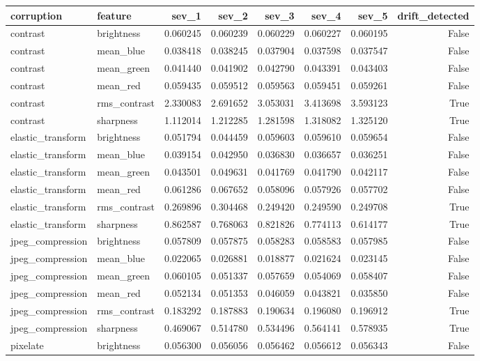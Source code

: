 \begin{tabular}{llrrrrrr}
\toprule
corruption & feature & sev_1 & sev_2 & sev_3 & sev_4 & sev_5 & drift_detected \\
\midrule
contrast & brightness & 0.060245 & 0.060239 & 0.060229 & 0.060227 & 0.060195 & False \\
contrast & mean_blue & 0.038418 & 0.038245 & 0.037904 & 0.037598 & 0.037547 & False \\
contrast & mean_green & 0.041440 & 0.041902 & 0.042790 & 0.043391 & 0.043403 & False \\
contrast & mean_red & 0.059435 & 0.059512 & 0.059563 & 0.059451 & 0.059261 & False \\
contrast & rms_contrast & 2.330083 & 2.691652 & 3.053031 & 3.413698 & 3.593123 & True \\
contrast & sharpness & 1.112014 & 1.212285 & 1.281598 & 1.318082 & 1.325120 & True \\
elastic_transform & brightness & 0.051794 & 0.044459 & 0.059603 & 0.059610 & 0.059654 & False \\
elastic_transform & mean_blue & 0.039154 & 0.042950 & 0.036830 & 0.036657 & 0.036251 & False \\
elastic_transform & mean_green & 0.043501 & 0.049631 & 0.041769 & 0.041790 & 0.042117 & False \\
elastic_transform & mean_red & 0.061286 & 0.067652 & 0.058096 & 0.057926 & 0.057702 & False \\
elastic_transform & rms_contrast & 0.269896 & 0.304468 & 0.249420 & 0.249590 & 0.249708 & True \\
elastic_transform & sharpness & 0.862587 & 0.768063 & 0.821826 & 0.774113 & 0.614177 & True \\
jpeg_compression & brightness & 0.057809 & 0.057875 & 0.058283 & 0.058583 & 0.057985 & False \\
jpeg_compression & mean_blue & 0.022065 & 0.026881 & 0.018877 & 0.021624 & 0.023145 & False \\
jpeg_compression & mean_green & 0.060105 & 0.051337 & 0.057659 & 0.054069 & 0.058407 & False \\
jpeg_compression & mean_red & 0.052134 & 0.051353 & 0.046059 & 0.043821 & 0.035850 & False \\
jpeg_compression & rms_contrast & 0.183292 & 0.187883 & 0.190634 & 0.196080 & 0.196912 & True \\
jpeg_compression & sharpness & 0.469067 & 0.514780 & 0.534496 & 0.564141 & 0.578935 & True \\
pixelate & brightness & 0.056300 & 0.056056 & 0.056462 & 0.056612 & 0.056343 & False \\

\end{tabular}
